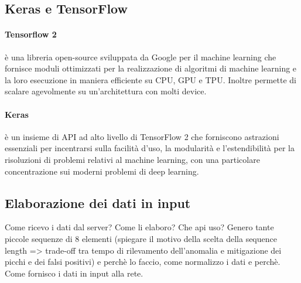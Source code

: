 \subsection{Keras e TensorFlow}

\paragraph{Tensorflow 2} è una libreria open-source sviluppata da Google per il machine learning che fornisce moduli ottimizzati per la realizzazione di algoritmi di machine learning e la loro esecuzione in maniera efficiente su CPU, GPU e TPU. Inoltre permette di scalare agevolmente su un'architettura con molti device.

\paragraph{Keras} è un insieme di API ad alto livello di TensorFlow 2 che forniscono astrazioni essenziali per incentrarsi sulla facilità d'uso, la modularità e l'estendibilità per la risoluzioni di problemi relativi al machine learning, con una particolare concentrazione sui moderni problemi di deep learning.


\subsection{Elaborazione dei dati in input}
Come ricevo i dati dal server? Come li elaboro? Che api uso?
Genero tante piccole sequenze di 8 elementi (spiegare il motivo della scelta della sequence length => trade-off tra tempo di rilevamento dell'anomalia e mitigazione dei picchi e dei falsi positivi) e perchè lo faccio, come normalizzo i dati e perchè. Come fornisco i dati in input alla rete.



